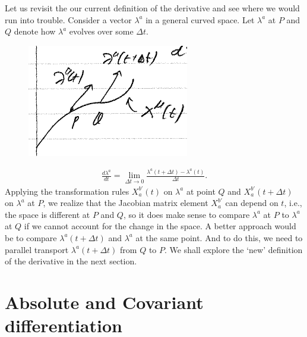 \documentclass{book}
\theoremstyle{definition}
\begin{document}
Let us revisit the our current definition of the derivative and see where we would run into trouble. Consider a vector $\lambda^a$ in a general curved space. Let $\lambda^a$ at $P$ and $Q$ denote how $\lambda^a$ evolves over some $\Delta t$.
\begin{figure}[!htb]
	\centering
	\includegraphics[scale=0.6]{covar}
\end{figure}
\begin{align*}
\frac{d\lambda^a}{dt} = \lim_{\Delta t \rightarrow 0}\frac{\lambda^a(t+\Delta t) - \lambda^a(t)}{\Delta t}.
\end{align*}
Applying the transformation rules $X^{b'}_a(t)$ on $\lambda^a$ at point $Q$ and $X^{b'}_a(t+\Delta t)$ on $\lambda^a$ at $P$, we realize that the Jacobian matrix element $X^{b'}_a$ can depend on $t$, i.e., the space is different at $P$ and $Q$, so it does make sense to compare $\lambda^a$ at $P$ to $\lambda^a$ at $Q$ if we cannot account for the change in the space. A better approach would be to compare $\lambda^a(t+\Delta t)$ and $\lambda^a$ at the same point. And to do this, we need to parallel transport $\lambda^a(t+\Delta t)$ from $Q$ to $P$. We shall explore the `new' definition of the derivative in the next section.


\section{Absolute and Covariant differentiation}
\end{document}
